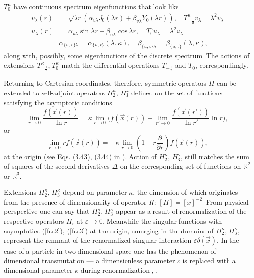 \documentclass[12pt]{article}
\newcommand{\Hh}{H}
\newcommand{\RR}{\mathbb{R}}
\newcommand{\ve}{\varepsilon}
\begin{document}
$ T_{0}^{\kappa} $
	have continuous spectrum eigenfunctions that look like
\begin{align*}
    v_{\lambda}(r) &= \sqrt{\lambda r} (\alpha_{v\lambda} J_{0}(\lambda r)
	+ \beta_{v\lambda} Y_{0}(\lambda r)) , 
    \quad T_{-\frac{1}{2}}^{\kappa} v_{\lambda} = \lambda^{2} v_{\lambda}\\
    u_{\lambda}(r) &= \alpha_{u\lambda} \sin \lambda r
	+ \beta_{u\lambda} \cos\lambda r , 
    \quad T_{0}^{\kappa} u_{\lambda} = \lambda^{2} u_{\lambda}\\
    &\alpha_{\{u,v\}\lambda} = \alpha_{\{u,v\}}(\lambda,\kappa), \quad
    \beta_{\{u,v\}\lambda} = \beta_{\{u,v\}}(\lambda,\kappa),
\end{align*}
	along with, possibly, some eigenfunctions of the discrete spectrum.
	The actions of extensions
$ T_{-\frac{1}{2}}^{\kappa} $,
$ T_{0}^{\kappa} $
	match the differential operations
$ T_{-\frac{1}{2}} $ and
$ T_{0} $, correspondingly.

	Returning to Cartesian coordinates, therefore, symmetric operators
$ \Hh $
	can be extended to self-adjoint operators
$ \Hh_{2}^{\kappa} $, 
$ \Hh_{3}^{\kappa} $
	defined on the set of functions satisfying the asymptotic conditions
\begin{equation}
\label{fas2}
    \lim_{r\to 0} \frac{f(\vec{x}(r))}{\ln r} = \kappa \lim_{r\to 0}\bigl(
	f(\vec{x}(r)) -\lim_{r'\to 0} \frac{f(\vec{x}(r'))}{\ln r'} \ln r
    \bigr) ,
\end{equation}
	or
\begin{equation}
\label{fas3}
    \lim_{r\to 0} rf(\vec{x}(r)) = -\kappa \lim_{r\to 0}(
	1 + r \frac{\partial}{\partial r} ) f(\vec{x}(r)) ,
\end{equation}
	at the origin
    (see Eqs. (3.43), (3.44) in
\cite{Jackiw}).
	Action of 
$ \Hh_{2}^{\kappa} $,
$ \Hh_{3}^{\kappa} $,
	still matches the sum of squares of the second derivatives
$ \Delta $ on the corresponding set of functions on
$ \RR^{2} $ or
$ \RR^{3} $.

	Extensions
$ \Hh_{2}^{\kappa} $,
$ \Hh_{3}^{\kappa} $
	depend on parameter
$ \kappa $,
	the dimension of which originates from the presence of dimensionality of operator
$ \Hh $:
$ [\Hh] = [x]^{-2} $.
	From physical perspective one can say that
$ \Hh_{2}^{\kappa} $,
$ \Hh_{3}^{\kappa} $
	appear as a result of renormalization of the respective operators
$ \Hh_{\ve} $
	at
$ \ve \to 0 $.
    Meanwhile the singular functions with asymptotics
(\ref{fas2}),
(\ref{fas3})
	at the origin, emerging in the domains of
$ \Hh_{2}^{\kappa} $,
$ \Hh_{3}^{\kappa} $,
    represent the remnant of the
	renormalized singular interaction
$ \ve \delta(\vec{x}) $.
	In the case of a particle in two-dimensional space one
	has the phenomenon of dimensional transmutation ---
	a dimensionless parameter
$ \ve $
	is replaced with a dimensional parameter
$ \kappa $
	during renormalization
\cite{LFBrazil}, \cite{LFres}.
\end{document}
